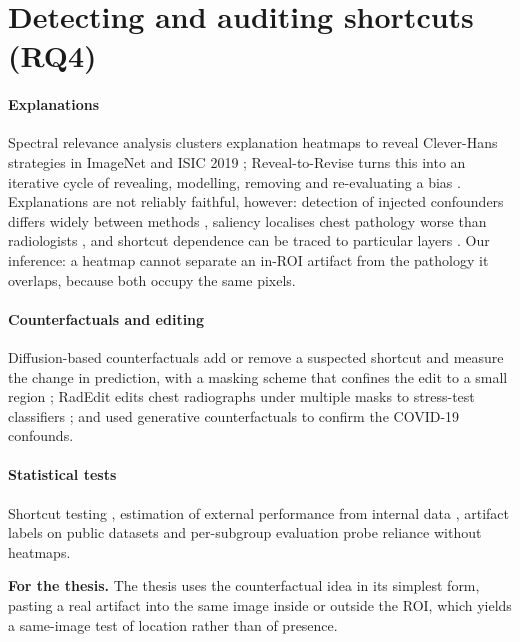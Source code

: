 \documentclass[11pt,a4paper]{article}
\newcommand{\takeaway}[1]{\par\smallskip\noindent\colorbox{gray!12}{\parbox{\dimexpr\linewidth-2\fboxsep}{\small\textbf{For the thesis.} #1}}\par\medskip}
\begin{document}
\section{Detecting and auditing shortcuts (RQ4)}\label{sec:detect}
\paragraph{Explanations} Spectral relevance analysis clusters explanation heatmaps to reveal Clever-Hans strategies in
ImageNet and ISIC 2019 \citep{anders2022clever}; Reveal-to-Revise turns this into an iterative cycle of revealing,
modelling, removing and re-evaluating a bias \citep{pahde2023r2r,pahde2025ensuring}. Explanations are not reliably
faithful, however: detection of injected confounders differs widely between methods \citep{sun2023right}, saliency
localises chest pathology worse than radiologists \citep{saporta2022saliency}, and shortcut dependence can be traced to
particular layers \citep{boland2024shortcuts}. Our inference: a heatmap cannot separate an in-ROI artifact from the
pathology it overlaps, because both occupy the same pixels.

\paragraph{Counterfactuals and editing} Diffusion-based counterfactuals add or remove a suspected shortcut and measure
the change in prediction, with a masking scheme that confines the edit to a small region \citep{weng2024fastdime};
RadEdit edits chest radiographs under multiple masks to stress-test classifiers \citep{perezgarcia2024radedit}; and
\citet{degrave2021ai} used generative counterfactuals to confirm the COVID-19 confounds.

\paragraph{Statistical tests} Shortcut testing \citep{brown2023shortcut}, estimation of external performance from
internal data \citep{ongly2024shortcut}, artifact labels on public datasets \citep{jimenez2023shortcuts} and
per-subgroup evaluation \citep{yang2024limits} probe reliance without heatmaps.
\takeaway{The thesis uses the counterfactual idea in its simplest form, pasting a real artifact into the same image
inside or outside the ROI, which yields a same-image test of location rather than of presence.}
\end{document}
